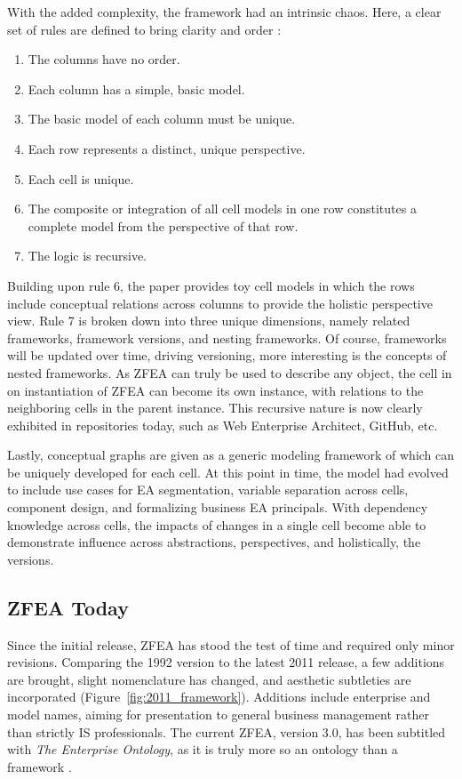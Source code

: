 \documentclass[12pt,conference]{IEEEtran}
\begin{document}
With the added complexity, the framework had an intrinsic chaos. 
Here, a clear set of rules are defined to bring clarity and order \cite{zachman_ibm_1992}:
\begin{enumerate}
    \item The columns have no order.
    \item Each column has a simple, basic model.
    \item The basic model of each column must be unique. 
    \item Each row represents a distinct, unique perspective.
    \item Each cell is unique.
    \item The composite or integration of all cell models in one row constitutes a complete model from the perspective of that row.
    \item The logic is recursive.
\end{enumerate}
Building upon rule 6, the paper provides toy cell models in which the rows include conceptual relations across columns to provide the holistic perspective view. 
Rule 7 is broken down into three unique dimensions, namely related frameworks, framework versions, and nesting frameworks. 
Of course, frameworks will be updated over time, driving versioning, more interesting is the concepts of nested frameworks. 
As ZFEA can truly be used to describe any object, the cell in on instantiation of ZFEA can become its own instance, with relations to the neighboring cells in the parent instance. 
This recursive nature is now clearly exhibited in repositories today, such as Web Enterprise Architect, GitHub, etc.

Lastly, conceptual graphs are given as a generic modeling framework of which can be uniquely developed for each cell. 
At this point in time, the model had evolved to include use cases for EA segmentation, variable separation across cells, component design, and formalizing business EA principals. 
With dependency knowledge across cells, the impacts of changes in a single cell become able to demonstrate influence across abstractions, perspectives, and holistically, the versions. 

\subsection{ZFEA Today}
Since the initial release, ZFEA has stood the test of time and required only minor revisions. 
Comparing the 1992 version to the latest 2011 release, a few additions are brought, slight nomenclature has changed, and aesthetic subtleties are incorporated (Figure~\ref{fig:2011_framework}). 
Additions include enterprise and model names, aiming for presentation to general business management rather than strictly IS professionals. 
The current ZFEA, version 3.0, has been subtitled with \emph{The Enterprise Ontology}, as it is truly more so an ontology than a framework \cite{Zachman_Evolution}. 
\end{document}
